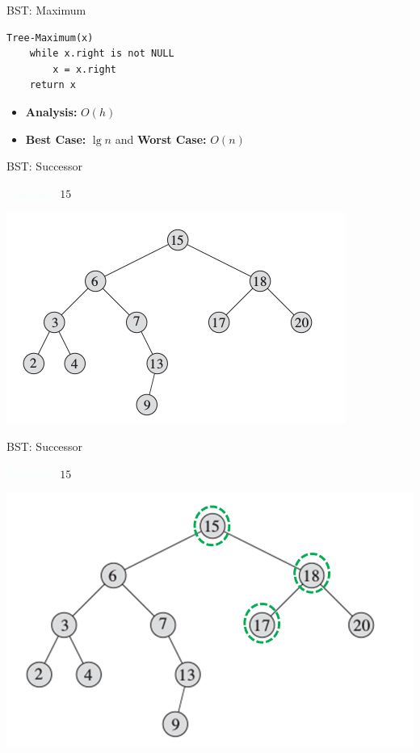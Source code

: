 \documentclass{beamer}
\newcommand{\tblue}[1]{{\Large {\textcolor{azure}{#1}}}}
\begin{document}
\begin{frame}[fragile]{BST: Maximum}
\begin{verbatim}
Tree-Maximum(x)
    while x.right is not NULL
        x = x.right
    return x
\end{verbatim}
    \begin{itemize}
        \item {\bf Analysis:} $O(h)$
        \item {\bf Best Case:} $\lg n$ and {\bf Worst Case:} $O(n)$
    \end{itemize}
\end{frame}


\begin{frame}{BST: Successor}

\tblue{Successor:} $15$
    \begin{center}
        \includegraphics[scale=0.7]{bstSearch.png}
    \end{center}
\end{frame}


\begin{frame}{BST: Successor}

\tblue{Successor:} $15$
    \begin{center}
        \includegraphics[scale=0.5]{bstSuccessor2.png}
    \end{center}
\end{frame}
\end{document}
